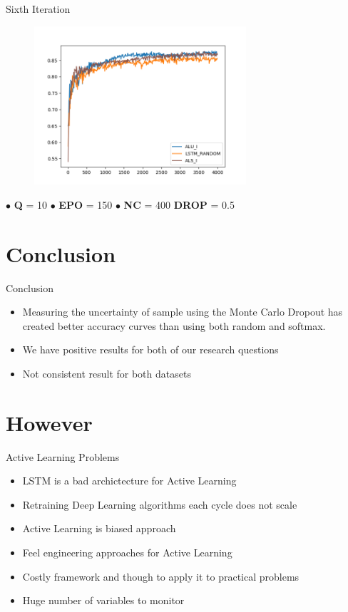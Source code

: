 \documentclass[10pt]{beamer}
\begin{document}
\begin{frame}[fragile]{Sixth Iteration}
\begin{figure}[H]
    \centering
    \includegraphics[width=0.7\textwidth]{images/subj_n150_q10_softmax_bald_comparison}
\end{figure}

\hspace{0.5cm} $\bullet$ \textbf{Q} = 10 \hspace{0.5cm} $\bullet$ \textbf{EPO} = 150 \hspace{0.5cm} $\bullet$ \textbf{NC} = 400 \hspace{0.5cm} \textbf{DROP} = 0.5
\end{frame}

\section{Conclusion}

\begin{frame}[fragile]{Conclusion}
\begin{itemize}
\item Measuring the uncertainty of sample using the Monte Carlo Dropout has created better
      accuracy curves than using both random and softmax.
\item We have positive results for both of our research questions
\item Not consistent result for both datasets
\end{itemize}
\end{frame}

\section{However}

\begin{frame}[fragile]{Active Learning Problems}
\begin{itemize}
\item LSTM is a bad archictecture for Active Learning
\item Retraining Deep Learning algorithms each cycle does not scale
\item Active Learning is biased approach
\item Feel engineering approaches for Active Learning
\item Costly framework and though to apply it to practical problems
\item Huge number of variables to monitor
\end{itemize}
\end{frame}
\end{document}
